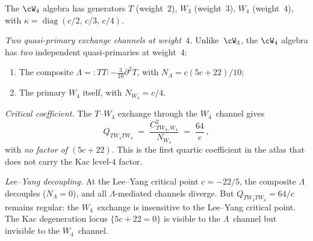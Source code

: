 \begin{computation}%
\label{comp:w4-shadow-tower}%
%
The $\cW_4$ algebra has generators $T$ (weight~$2$),
$W_3$ (weight~$3$), $W_4$ (weight~$4$), with
$\kappa = \operatorname{diag}(c/2,\, c/3,\, c/4)$.

\smallskip
\noindent
\emph{Two quasi-primary exchange channels at weight~$4$.}
Unlike~$\cW_3$, the $\cW_4$ algebra has \emph{two}
independent quasi-primaries at weight~$4$:
\begin{enumerate}[label=\textup{(\alph*)}]
\item The composite $\Lambda = {:}TT{:}
 - \tfrac{3}{10}\partial^2 T$, with
 $N_\Lambda = c(5c{+}22)/10$\textup{;}
\item The primary $W_4$ itself, with $N_{W_4} = c/4$.
\end{enumerate}

\noindent
\emph{Critical coefficient.}
The $T$--$W_4$ exchange through the $W_4$~channel gives
\begin{equation}\label{eq:w4-critical}
 Q_{TW_4 TW_4}
 \;=\;
 \frac{C_{TW_4,W_4}^2}{N_{W_4}}
 \;=\;
 \frac{64}{c}\,,
\end{equation}
with \emph{no factor of $(5c{+}22)$}. This is the first
quartic coefficient in the atlas that does not carry the
Kac level-$4$ factor.

\smallskip
\noindent
\emph{Lee--Yang decoupling.}
At the Lee--Yang critical point $c = -22/5$, the composite
$\Lambda$ decouples ($N_\Lambda = 0$), and all
$\Lambda$-mediated channels diverge. But
$Q_{TW_4 TW_4} = 64/c$ remains regular: the
$W_4$~exchange is insensitive to the Lee--Yang critical
point. The Kac degeneration locus $\{5c+22=0\}$ is visible
to the $\Lambda$~channel but invisible to the $W_4$~channel.
\end{computation}

